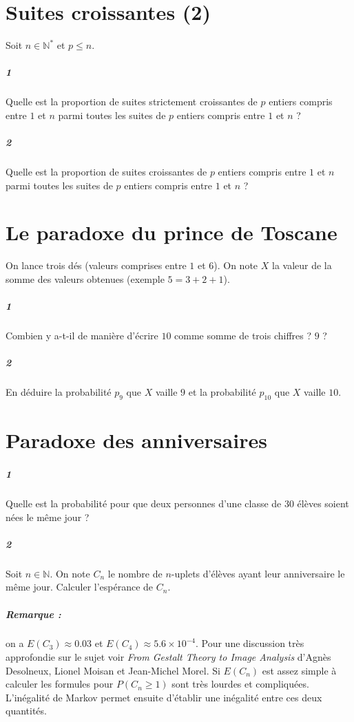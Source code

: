 \documentclass[10pt,a4paper]{article}
\begin{document}
\section{Suites croissantes (2)}
Soit $n \in \mathbb{N}^*$ et $p \le n$.
\subparagraph{1}Quelle est la proportion de suites strictement croissantes de $p$ entiers compris entre $1$ et $n$ parmi toutes les suites de $p$ entiers compris entre $1$ et $n$ ?
\subparagraph{2} Quelle est la proportion de suites croissantes de $p$ entiers compris entre $1$ et $n$ parmi toutes les suites de $p$ entiers compris entre $1$ et $n$ ?

\section{Le paradoxe du prince de Toscane}
On lance trois dés (valeurs comprises entre $1$ et $6$). On note $X$ la valeur de la somme des valeurs obtenues (exemple $5=3+2+1$).
\subparagraph{1}Combien y a-t-il de manière d'écrire $10$ comme somme de trois chiffres ? $9$ ?
\subparagraph{2}En déduire la probabilité $p_9$ que $X$ vaille $9$ et la probabilité $p_{10}$ que $X$ vaille $10$.

\section{Paradoxe des anniversaires}
\subparagraph{1}Quelle est la probabilité pour que deux personnes d'une classe de 30 élèves soient nées le même jour ?
\subparagraph{2}Soit $n \in \mathbb{N}$. On note $C_n$ le nombre de $n$-uplets d'élèves ayant leur anniversaire le même jour. Calculer l'espérance de $C_n$.
\subparagraph{Remarque :} on a $E(C_3) \approx 0.03$ et $E(C_4) \approx 5.6 \times 10^{-4}$. Pour une discussion très approfondie sur le sujet voir \textit{From Gestalt Theory to Image Analysis} d'Agnès Desolneux, Lionel Moisan et Jean-Michel Morel. Si $E(C_n)$ est assez simple à calculer les formules pour $P(C_n \ge 1)$ sont très lourdes et compliquées. L'inégalité de Markov permet ensuite d'établir une inégalité entre ces deux quantités.
\end{document}
